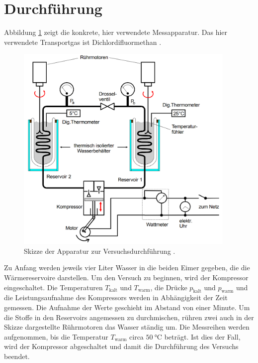 \section{Durchführung}
\label{sec:Durchführung}
Abbildung \ref{fig:waermepumpebildkonkret} zeigt die konkrete, hier verwendete
Messapparatur. Das hier verwendete Transportgas ist Dichlordifluormethan
.
\begin{figure}
  \centering
  \includegraphics[width=300pt]{data/waermepumpekonkret.png}
  \caption{Skizze der Apparatur zur Versuchsdurchführung \cite{Versuchsanleitung}.}
  \label{fig:waermepumpebildkonkret}
\end{figure}
Zu Anfang werden jeweils vier Liter Wasser in die beiden Eimer gegeben, die die
Wärmereservoire darstellen. Um den Versuch zu beginnen, wird der Kompressor eingeschaltet.
Die Temperaturen $T_\text{kalt}$ und $T_\text{warm}$, die Drücke $p_\text{kalt}$
und $p_\text{warm}$ und die Leistungsaufnahme des Kompressors werden in Abhängigkeit der
Zeit gemessen. Die Aufnahme der Werte geschieht im Abstand von einer Minute. Um die
Stoffe in den Reservoirs angemessen zu durchmischen, rühren zwei auch in der Skizze dargestellte
Rührmotoren das Wasser ständig um. Die Messreihen werden aufgenommen, bis die Temperatur
$T_\text{warm}$ circa $\SI{50}{\celsius}$ beträgt. Ist dies der Fall, wird der Kompressor
abgeschaltet und damit die Durchführung des Versuchs beendet.
